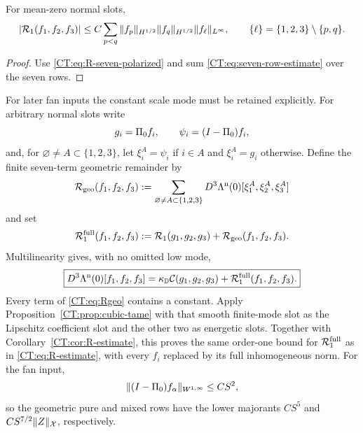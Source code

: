\begin{corollary}
\label{CT:cor:R-estimate}
For mean-zero normal slots,
\begin{equation}\label{CT:eq:R-estimate}
 |\mathcal R_1(f_1,f_2,f_3)|
 \le C\sum_{p<q}\|f_p\|_{H^{1/2}}
                    \|f_q\|_{H^{1/2}}
                    \|f_\ell\|_{L^\infty},
 \qquad \{\ell\}=\{1,2,3\}\setminus\{p,q\}.
\end{equation}
\end{corollary}

\begin{proof}
Use \eqref{CT:eq:R-seven-polarized} and sum
\eqref{CT:eq:seven-row-estimate} over the seven rows.
\end{proof}

For later fan inputs the constant scale mode must be retained explicitly.
For arbitrary normal slots write
\begin{equation*}
 g_i=\Pi_0 f_i,
 \qquad \psi_i=(I-\Pi_0)f_i,
\end{equation*}
and, for $\varnothing\ne A\subset\{1,2,3\}$, let
$\xi_i^A=\psi_i$ if $i\in A$ and $\xi_i^A=g_i$ otherwise.  Define the
finite seven-term geometric remainder by
\begin{equation}\label{CT:eq:Rgeo}
 \mathcal R_{\rm geo}(f_1,f_2,f_3)
 :=\sum_{\varnothing\ne A\subset\{1,2,3\}}
 D^3\Lambda^{\rm n}(0)
 [\xi_1^A,\xi_2^A,\xi_3^A]
\end{equation}
and set
\begin{equation}\label{CT:eq:Rfull}
 \mathcal R_1^{\rm full}(f_1,f_2,f_3)
 :=\mathcal R_1(g_1,g_2,g_3)+\mathcal R_{\rm geo}(f_1,f_2,f_3).
\end{equation}
Multilinearity gives, with no omitted low mode,
\begin{equation}\label{CT:eq:normal-full-split}
 \boxed{
 D^3\Lambda^{\rm n}(0)[f_1,f_2,f_3]
 =\kappa_{\mathbb D}\mathcal C(g_1,g_2,g_3)
  +\mathcal R_1^{\rm full}(f_1,f_2,f_3).}
\end{equation}
Every term of \eqref{CT:eq:Rgeo} contains a constant.
Apply Proposition~\ref{CT:prop:cubic-tame} with that smooth finite-mode slot
as the Lipschitz coefficient slot and the other two as energetic slots.
Together with Corollary~\ref{CT:cor:R-estimate}, this proves the same
order-one bound for $\mathcal R_1^{\rm full}$ as in \eqref{CT:eq:R-estimate}, with every $f_i$
replaced by its full inhomogeneous norm.  For the fan input,
\begin{equation}\label{CT:eq:fan-geometric-size}
 \|(I-\Pi_0)f_\alpha\|_{W^{1,\infty}}\le CS^2,
\end{equation}
so the geometric pure and mixed rows have the lower majorants $CS^5$ and
$CS^{7/2}\|Z\|_\mathcal X$, respectively.

